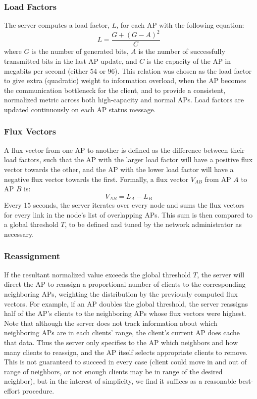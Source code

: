 \documentclass[10pt,journal,compsoc]{IEEEtran}
\begin{document}
		\subsubsection{Load Factors}
		The server computes a load factor, \(L\), for each AP with the following equation:
		\[L = \dfrac{G + (G-A)^2}{C}\]
		where \(G\) is the number of generated bits, \(A\) is the number of successfully transmitted bits in the last AP update, and \(C\) is the capacity of the AP in megabits per second (either 54 or 96). This relation was chosen as the load factor to give extra (quadratic) weight to information overload, when the AP becomes the communication bottleneck for the client, and to provide a consistent, normalized metric across both high-capacity and normal APs. Load factors are updated continuously on each AP status message.
		
		\subsubsection{Flux Vectors}
		A flux vector from one AP to another is defined as the difference between their load factors, such that the AP with the larger load factor will have a positive flux vector towards the other, and the AP with the lower load factor will have a negative flux vector towards the first. Formally, a flux vector \(V_{AB}\) from AP \(A\) to AP \(B\) is:
		\[V_{AB} = L_A - L_B\]
		Every 15 seconds, the server iterates over every node and sums the flux vectors for every link in the node's list of overlapping APs. This sum is then compared to a global threshold \(T\), to be defined and tuned by the network administrator as necessary.
		
		\subsubsection{Reassignment}
		If the resultant normalized value exceeds the global threshold \(T\), the server will direct the AP to reassign a proportional number of clients to the corresponding neighboring APs, weighting the distribution by the previously computed flux vectors. For example, if an AP doubles the global threshold, the server reassigns half of the AP's clients to the neighboring APs whose flux vectors were highest. Note that although the server does not track information about which neighboring APs are in each clients' range, the client's current AP does cache that data. Thus the server only specifies to the AP which neighbors and how many clients to reassign, and the AP itself selects appropriate clients to remove. This is not guaranteed to succeed in every case (client could move in and out of range of neighbors, or not enough clients may be in range of the desired neighbor), but in the interest of simplicity, we find it suffices as a reasonable best-effort procedure.
		
\end{document}
